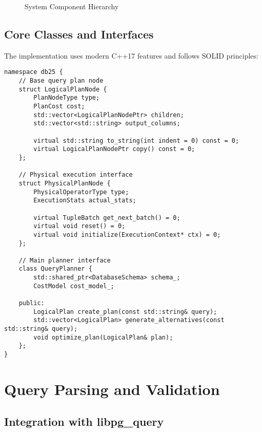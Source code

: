 \documentclass[12pt,a4paper]{article}
\begin{document}
\begin{figure}[htbp]
        \caption{System Component Hierarchy}
        \label{fig:components}
    \end{figure}

    \subsection{Core Classes and Interfaces}

    The implementation uses modern C++17 features and follows SOLID principles:

    \begin{lstlisting}[style=cpp, caption=Core Interface Definitions]
namespace db25 {
    // Base query plan node
    struct LogicalPlanNode {
        PlanNodeType type;
        PlanCost cost;
        std::vector<LogicalPlanNodePtr> children;
        std::vector<std::string> output_columns;

        virtual std::string to_string(int indent = 0) const = 0;
        virtual LogicalPlanNodePtr copy() const = 0;
    };

    // Physical execution interface
    struct PhysicalPlanNode {
        PhysicalOperatorType type;
        ExecutionStats actual_stats;

        virtual TupleBatch get_next_batch() = 0;
        virtual void reset() = 0;
        virtual void initialize(ExecutionContext* ctx) = 0;
    };

    // Main planner interface
    class QueryPlanner {
        std::shared_ptr<DatabaseSchema> schema_;
        CostModel cost_model_;

    public:
        LogicalPlan create_plan(const std::string& query);
        std::vector<LogicalPlan> generate_alternatives(const std::string& query);
        void optimize_plan(LogicalPlan& plan);
    };
}
    \end{lstlisting}

    \section{Query Parsing and Validation}

    \subsection{Integration with libpg\_query}
\end{document}
